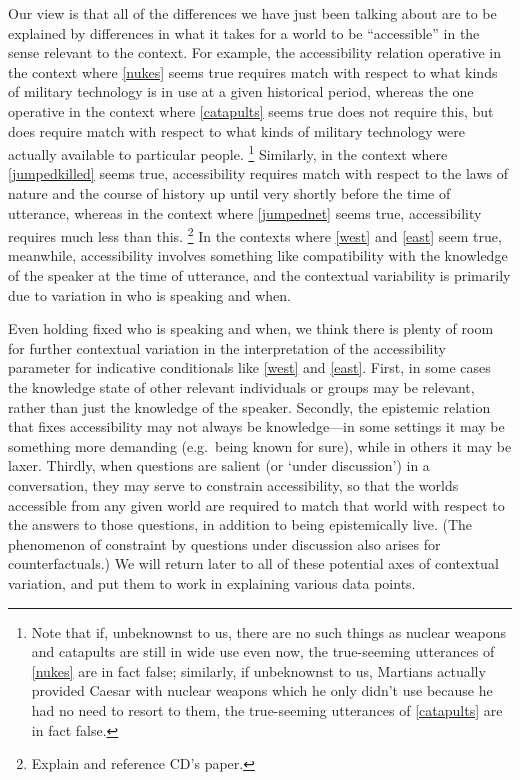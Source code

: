 \documentclass[If.tex]{subfiles}
\begin{document}

Our view is that all of the differences we have just been talking about are to be explained by differences in what it takes for a world to be “accessible” in the sense relevant to the context. For example, the accessibility relation operative in the context where \ref{nukes} seems true requires match with respect to what kinds of military technology is in use at a given historical period, whereas the one operative in the context where \ref{catapults} seems true does not require this, but does require match with respect to what kinds of military technology were actually available to particular people.%
\footnote{Note that if, unbeknownst to us, there are no such things as nuclear weapons and catapults are still in wide use even now, the true-seeming utterances of \ref{nukes} are in fact false; similarly, if unbeknownst to us, Martians actually provided Caesar with nuclear weapons which he only didn't use because he had no need to resort to them, the true-seeming utterances of \ref{catapults} are in fact false.}
 Similarly, in the context where \ref{jumpedkilled} seems true, accessibility requires match with respect to the laws of nature and the course of history up until very shortly before the time of utterance, whereas in the context where \ref{jumpednet} seems true, accessibility requires much less than this.%
\footnote{Explain and reference CD's paper.}
 In the contexts where \ref{west} and \ref{east} seem true, meanwhile, accessibility involves something like compatibility with the knowledge of the speaker at the time of utterance, and the contextual variability is primarily due to variation in who is speaking and when.

Even holding fixed who is speaking and when, we think there is plenty of room for further contextual variation in the interpretation of the accessibility parameter for indicative conditionals like \ref{west} and \ref{east}.  First, in some cases the knowledge state of other relevant individuals or groups may be relevant, rather than just the knowledge of the speaker.  Secondly, the epistemic relation that fixes accessibility may not always be knowledge---in some settings it may be something more demanding (e.g.\ being known for sure), while in others it may be laxer.   Thirdly, when questions are salient (or ‘under discussion’) in a conversation, they may serve to constrain accessibility, so that the worlds accessible from any given world are required to match that world with respect to the answers to those questions, in addition to being epistemically live.  (The phenomenon of constraint by questions under discussion also arises for counterfactuals.)  We will return later to all of these potential axes of contextual variation, and put them to work in explaining various data points.  
\end{document}

